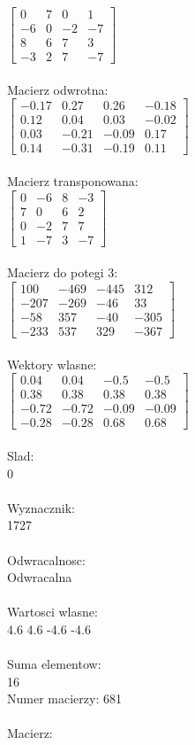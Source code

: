 \documentclass[a4paper,12pt]{article}
\begin{document}
$\begin{bmatrix} 0&7&0&1\\-6&0&-2&-7\\8&6&7&3\\-3&2&7&-7 \end{bmatrix}$
\\
\\
Macierz odwrotna:\\

$\begin{bmatrix} -0.17&0.27&0.26&-0.18\\0.12&0.04&0.03&-0.02\\0.03&-0.21&-0.09&0.17\\0.14&-0.31&-0.19&0.11 \end{bmatrix}$
\\
\\
Macierz transponowana:\\

$\begin{bmatrix} 0&-6&8&-3\\7&0&6&2\\0&-2&7&7\\1&-7&3&-7 \end{bmatrix}$
\\
\\
Macierz do potegi 3:\\

$\begin{bmatrix} 100&-469&-445&312\\-207&-269&-46&33\\-58&357&-40&-305\\-233&537&329&-367 \end{bmatrix}$
\\
\\
Wektory wlasne:\\

$\begin{bmatrix} 0.04&0.04&-0.5&-0.5\\0.38&0.38&0.38&0.38\\-0.72&-0.72&-0.09&-0.09\\-0.28&-0.28&0.68&0.68 \end{bmatrix}$
\\
\\
Slad:\\
0
\\
\\
Wyznacznik:\\
1727
\\
\\
Odwracalnosc:\\
Odwracalna
\\
\\
Wartosci wlasne:\\
4.6 4.6 -4.6 -4.6
\\
\\
Suma elementow:\\
16
\\
\newpage
Numer macierzy:
681
\\
\\
Macierz:\\
\end{document}
